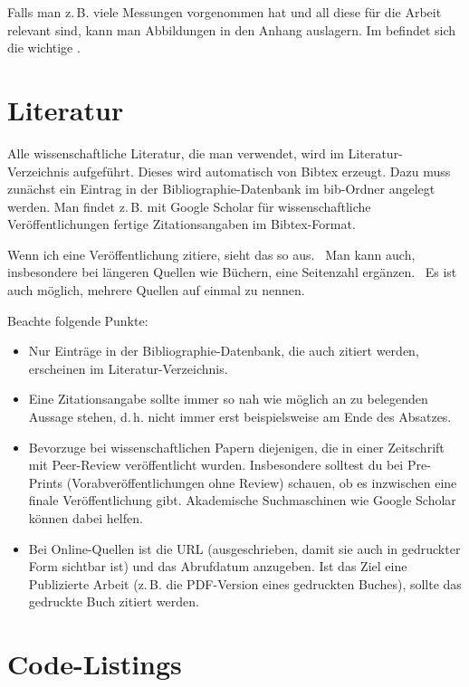 Falls man z.\,B. viele Messungen vorgenommen hat und all diese für die Arbeit relevant sind, kann man Abbildungen in den Anhang auslagern.
Im  befindet sich die wichtige .

\section{Literatur}
Alle wissenschaftliche Literatur, die man verwendet, wird im Literatur-Verzeichnis aufgeführt.
Dieses wird automatisch von Bibtex erzeugt.
Dazu muss zunächst ein Eintrag in der Bibliographie-Datenbank im bib-Ordner angelegt werden.
Man findet z.\,B. mit Google Scho\-lar für wissenschaftliche Veröffentlichungen fertige Zitationsangaben im Bibtex-Format.

Wenn ich eine Veröffentlichung zitiere, sieht das so aus.~\cite{Krauthoff2017a}
Man kann auch, insbesondere bei längeren Quellen wie Büchern, eine Seitenzahl ergänzen.~\cite[S.~5]{Krauthoff2017a}
Es ist auch möglich, mehrere Quellen auf einmal zu nennen.\cite{Krauthoff2017a,dun:j:argument-acceptability}

Beachte folgende Punkte:
\begin{itemize}
    \item Nur Einträge in der Bibliographie-Datenbank, die auch zitiert werden, erscheinen im Literatur-Verzeichnis.
    \item Eine Zitationsangabe sollte immer so nah wie möglich an zu belegenden Aussage stehen, d.\,h. nicht immer erst beispielsweise am Ende des Absatzes.
    \item Bevorzuge bei wissenschaftlichen Papern diejenigen, die in einer Zeitschrift mit Peer-Review veröffentlicht wurden. Insbesondere solltest du bei Pre-Prints (Vorabveröffentlichungen ohne Review) schauen, ob es inzwischen eine finale Veröffentlichung gibt. Akademische Suchmaschinen wie Google Scholar können dabei helfen.
    \item Bei Online-Quellen \cite{jvmspec} ist die URL (ausgeschrieben, damit sie auch in gedruckter Form sichtbar ist) und das Abrufdatum anzugeben. Ist das Ziel eine Publizierte Arbeit (z.\,B. die PDF-Version eines gedruckten Buches), sollte das gedruckte Buch zitiert werden.
\end{itemize}

\section{Code-Listings}

